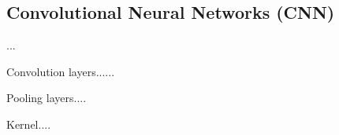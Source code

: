 \subsection{Convolutional Neural Networks (CNN)}
\label{appendix:cnn}

...

Convolution layers......




Pooling layers....


Kernel....